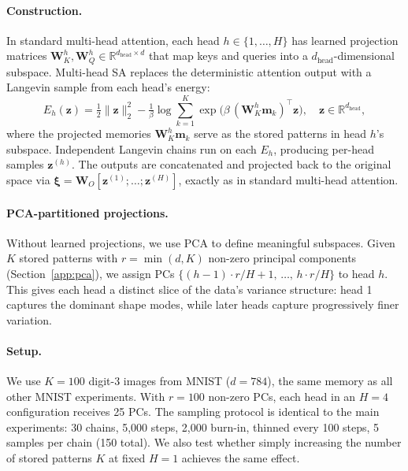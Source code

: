 \paragraph{Construction.}
In standard multi-head attention, each head $h \in \{1,\dots,H\}$ has learned projection matrices $\mathbf{W}_K^h, \mathbf{W}_Q^h \in \mathbb{R}^{d_{\mathrm{head}} \times d}$ that map keys and queries into a $d_{\mathrm{head}}$-dimensional subspace. Multi-head SA replaces the deterministic attention output with a Langevin sample from each head's energy:
\begin{equation}\label{eq:multihead-energy}
    E_h(\mathbf{z}) = \tfrac{1}{2}\|\mathbf{z}\|_2^2 - \tfrac{1}{\beta}\log\sum_{k=1}^{K}\exp\bigl(\beta\,(\mathbf{W}_K^h\mathbf{m}_k)^\top\mathbf{z}\bigr),
    \quad \mathbf{z} \in \mathbb{R}^{d_{\mathrm{head}}},
\end{equation}
where the projected memories $\mathbf{W}_K^h\mathbf{m}_k$ serve as the stored patterns in head $h$'s subspace. Independent Langevin chains run on each $E_h$, producing per-head samples $\mathbf{z}^{(h)}$. The outputs are concatenated and projected back to the original space via $\boldsymbol{\xi} = \mathbf{W}_O[\mathbf{z}^{(1)};\dots;\mathbf{z}^{(H)}]$, exactly as in standard multi-head attention.

\paragraph{PCA-partitioned projections.}
Without learned projections, we use PCA to define meaningful subspaces. Given $K$ stored patterns with $r = \min(d, K)$ non-zero principal components (Section~\ref{app:pca}), we assign PCs $\{(h{-}1) \cdot r/H + 1,\,\dots,\,h \cdot r/H\}$ to head $h$. This gives each head a distinct slice of the data's variance structure: head 1 captures the dominant shape modes, while later heads capture progressively finer variation.

\paragraph{Setup.}
We use $K{=}100$ digit-3 images from MNIST ($d{=}784$), the same memory as all other MNIST experiments. With $r{=}100$ non-zero PCs, each head in an $H{=}4$ configuration receives 25 PCs. The sampling protocol is identical to the main experiments: 30 chains, 5{,}000 steps, 2{,}000 burn-in, thinned every 100 steps, 5 samples per chain (150 total). We also test whether simply increasing the number of stored patterns $K$ at fixed $H{=}1$ achieves the same effect.

